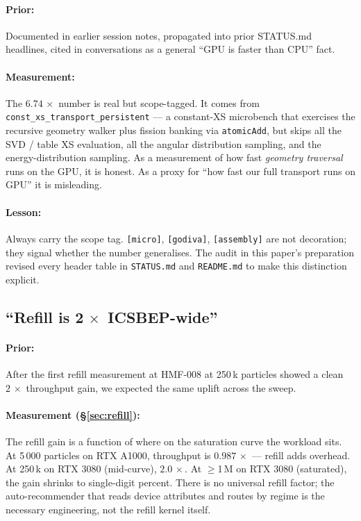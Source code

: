 \paragraph{Prior:} Documented in earlier session notes, propagated
into prior STATUS.md headlines, cited in conversations as a
general ``GPU is faster than CPU'' fact.

\paragraph{Measurement:} The $6.74\,\times$ number is real but
scope-tagged. It comes from
\texttt{const\_xs\_transport\_persistent} --- a constant-XS
microbench that exercises the recursive geometry walker plus
fission banking via \texttt{atomicAdd}, but skips all the SVD /
table XS evaluation, all the angular distribution sampling, and
the energy-distribution sampling. As a measurement of how fast
\emph{geometry traversal} runs on the GPU, it is honest. As a
proxy for ``how fast our full transport runs on GPU'' it is
misleading.

\paragraph{Lesson:} Always carry the scope tag.
\texttt{[micro]}, \texttt{[godiva]}, \texttt{[assembly]} are not
decoration; they signal whether the number generalises. The
audit in this paper's preparation revised every header table in
\texttt{STATUS.md} and \texttt{README.md} to make this distinction
explicit.

\subsection{``Refill is 2$\,\times$ ICSBEP-wide''}

\paragraph{Prior:} After the first refill measurement at HMF-008
at 250\,k particles showed a clean $2\,\times$ throughput gain, we
expected the same uplift across the sweep.

\paragraph{Measurement (§\ref{sec:refill}):} The refill gain is a
function of where on the saturation curve the workload sits. At
5\,000 particles on RTX A1000, throughput is $0.987\,\times$ ---
refill adds overhead. At 250\,k on RTX 3080 (mid-curve),
$2.0\,\times$. At $\geq$1\,M on RTX 3080 (saturated), the
gain shrinks to single-digit percent. There is no universal
refill factor; the auto-recommender that reads device attributes
and routes by regime is the necessary engineering, not the
refill kernel itself.

